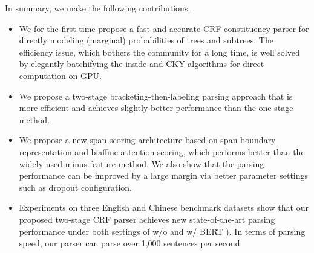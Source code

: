 In summary, we make the following contributions.
\begin{itemize}
    \item We for the first time propose a fast and accurate CRF constituency parser for directly modeling (marginal) probabilities of trees and subtrees.
          The efficiency issue, which bothers the community for a long time, is well solved by elegantly batchifying the inside and CKY algorithms for direct computation on GPU.


    \item We propose a two-stage bracketing-then-labeling parsing approach that is more efficient and achieves slightly better performance than the one-stage method.


    \item We propose a new span scoring architecture based on span boundary representation and biaffine attention scoring, which performs better than the widely used minus-feature method. %
          We also show that the parsing performance can be improved by a large margin via better parameter settings such as dropout configuration.

    \item Experiments on three English and Chinese benchmark datasets show that our proposed two-stage CRF parser achieves new state-of-the-art parsing performance under both settings of w/o and w/ BERT \cite{devlin-etal-2019-bert}).
          In terms of parsing speed, our parser can parse over 1,000 sentences per second.


\end{itemize}


